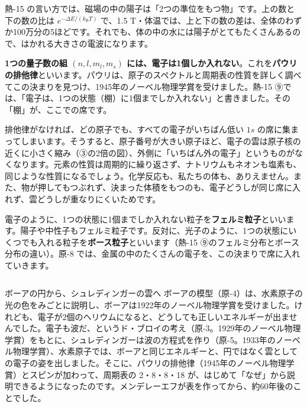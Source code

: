 熱-15 の言い方では、磁場の中の陽子は「2つの準位をもつ物」です。上の数と下の数の比は $e^{-\Delta E/(k_{\mathrm B}T)}$ で、1.5 T・体温では、上と下の数の差は、全体のわずか100万分の5ほどです。それでも、体の中の水には陽子がとてもたくさんあるので、はかれる大きさの電波になります。

\label{ph:原-7:sec7}
\textbf{1つの量子数の組 $(n,l,m_l,m_s)$ には、電子は1個しか入れない}。これを\textbf{パウリの排他律}といいます。パウリは、原子のスペクトルと周期表の性質を詳しく調べてこの決まりを見つけ、1945年のノーベル物理学賞を受けました。熱-15 ⑨では、「電子は、1つの状態（棚）に1個までしか入れない」と書きました。その「棚」が、ここでの席です。

排他律がなければ、どの原子でも、すべての電子がいちばん低い $1s$ の席に集まってしまいます。そうすると、原子番号が大きい原子ほど、電子の雲は原子核の近くに小さく縮み（③の2倍の図）、外側に「いちばん外の電子」というものがなくなります。元素の性質は周期的に繰り返さず、ナトリウムもネオンも塩素も、同じような性質になるでしょう。化学反応も、私たちの体も、ありえません。また、物が押してもつぶれず、決まった体積をもつのも、電子どうしが同じ席に入れず、雲どうしが重なりにくいためです。

電子のように、1つの状態に1個までしか入れない粒子を\textbf{フェルミ粒子}といいます。陽子や中性子もフェルミ粒子です。反対に、光子のように、1つの状態にいくつでも入れる粒子を\textbf{ボース粒子}といいます（熱-15 ⑨のフェルミ分布とボース分布の違い）。原-8 では、金属の中のたくさんの電子を、この決まりで席に入れていきます。

\begin{column}{ボーアの円から、シュレディンガーの雲へ}
ボーアの模型（原-4）は、水素原子の光の色をみごとに説明し、ボーアは1922年のノーベル物理学賞を受けました。けれども、電子が2個のヘリウムになると、どうしても正しいエネルギーが出ませんでした。電子も波だ、というド・ブロイの考え（原-3。1929年のノーベル物理学賞）をもとに、シュレディンガーは波の方程式を作り（原-5。1933年のノーベル物理学賞）、水素原子では、ボーアと同じエネルギーと、円ではなく雲としての電子の姿を出しました。そこに、パウリの排他律（1945年のノーベル物理学賞）とスピンが加わって、周期表の 2・8・8・18 が、はじめて「なぜ」から説明できるようになったのです。メンデレーエフが表を作ってから、約60年後のことでした。
\end{column}

